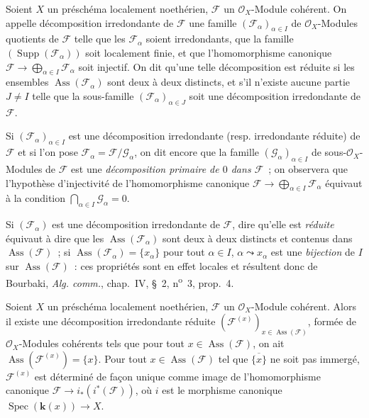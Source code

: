 \begin{definition}[3.2.5]
\label{IV.2.3.2.5-fr}
Soient $X$ un préschéma localement noethérien, $\mathcal F$ un
$\mathcal O_X$-Module cohérent. On appelle décomposition irredondante de
$\mathcal F$ une famille $(\mathcal F_\alpha)_{\alpha\in I}$ de
$\mathcal O_X$-Modules quotients de $\mathcal F$ telle que les
$\mathcal F_\alpha$ soient irredondants, que la famille
$(\operatorname{Supp}(\mathcal F_\alpha))$ soit localement finie, et que
l'homomorphisme canonique
$\mathcal F\to\bigoplus_{\alpha\in I}\mathcal F_\alpha$ soit injectif. On dit
qu'une telle décomposition est réduite si les ensembles
$\operatorname{Ass}(\mathcal F_\alpha)$ sont deux à deux distincts, et s'il
n'existe aucune partie $J\ne I$ telle que la sous-famille
$(\mathcal F_\alpha)_{\alpha\in J}$ soit une décomposition irredondante de
$\mathcal F$.
\end{definition}

Si $(\mathcal F_\alpha)_{\alpha\in I}$ est une décomposition irredondante
(resp. irredondante réduite) de $\mathcal F$ et si l'on pose
$\mathcal F_\alpha=\mathcal F/\mathcal G_\alpha$, on dit encore que la
famille $(\mathcal G_\alpha)_{\alpha\in I}$ de sous-$\mathcal O_X$-Modules de
$\mathcal F$ est une \emph{décomposition primaire de $0$ dans $\mathcal F$}~;
on observera que l'hypothèse d'injectivité de l'homomorphisme canonique
$\mathcal F\to\bigoplus_{\alpha\in I}\mathcal F_\alpha$ équivaut à la
condition $\bigcap_{\alpha\in I}\mathcal G_\alpha=0$.

Si $(\mathcal F_\alpha)$ est une décomposition irredondante de $\mathcal F$,
dire qu'elle est \emph{réduite} équivaut à dire que les
$\operatorname{Ass}(\mathcal F_\alpha)$ sont deux à deux distincts et contenus
dans $\operatorname{Ass}(\mathcal F)$~; si
$\operatorname{Ass}(\mathcal F_\alpha)=\{x_\alpha\}$ pour tout $\alpha\in I$,
$\alpha\leadsto x_\alpha$ est une \emph{bijection} de $I$ sur
$\operatorname{Ass}(\mathcal F)$~: ces propriétés sont en effet locales et
résultent donc de Bourbaki, \emph{Alg. comm.}, chap.~IV, \S~2,
n\textsuperscript{o}~3, prop.~4.

\begin{proposition}[3.2.6]
\label{IV.2.3.2.6-fr}
Soient $X$ un préschéma localement noethérien, $\mathcal F$ un
$\mathcal O_X$-Module cohérent. Alors il existe une décomposition irredondante
réduite $(\mathcal F^{(x)})_{x\in\operatorname{Ass}(\mathcal F)}$, formée de
$\mathcal O_X$-Modules cohérents tels que pour tout
$x\in\operatorname{Ass}(\mathcal F)$, on ait
$\operatorname{Ass}(\mathcal F^{(x)})=\{x\}$. Pour tout
$x\in\operatorname{Ass}(\mathcal F)$ tel que $\overline{\{x\}}$ ne soit pas
immergé, $\mathcal F^{(x)}$ est déterminé de façon unique comme image de
l'homomorphisme canonique $\mathcal F\to i_*(i^*(\mathcal F))$, où $i$ est le
morphisme canonique $\operatorname{Spec}(\boldsymbol{k}(x))\to X$.
\end{proposition}

